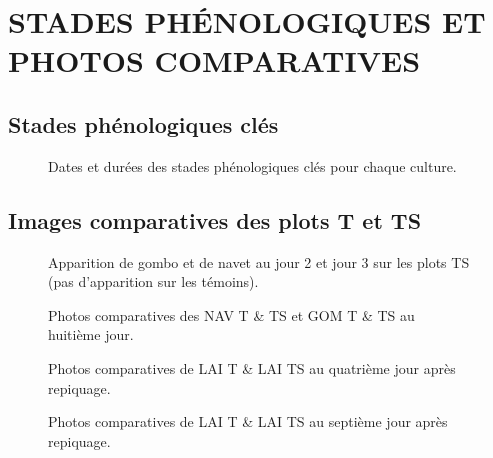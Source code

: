 \chapter{STADES PHÉNOLOGIQUES ET PHOTOS COMPARATIVES}
\label{ann:photos}

\section{Stades phénologiques clés}

\begin{figure}[H]
    \centering
    \caption{Dates et durées des stades phénologiques clés pour chaque culture. }
    \label{fig:stade-cles}
\end{figure}

\section{Images comparatives des plots T et TS}

\begin{figure}[H]
    \centering
    \caption{Apparition de gombo et de navet au jour 2 et jour 3 sur les plots TS (pas d'apparition sur les témoins). }
    \label{fig:gom-nav-j2}
\end{figure}

\begin{figure}[H]
    \centering
    \caption{Photos comparatives des NAV T \& TS et GOM T \& TS au huitième jour. }
    \label{fig:gom-nav-j8}
\end{figure}

\begin{figure}[H]
    \centering
    \caption{Photos comparatives de LAI T \& LAI TS au quatrième jour après repiquage. }
    \label{fig:laitue-j4}
\end{figure}

\begin{figure}[H]
    \centering
    \caption{Photos comparatives de LAI T \& LAI TS au septième jour après repiquage. }
    \label{fig:laitue-j7}
\end{figure}
